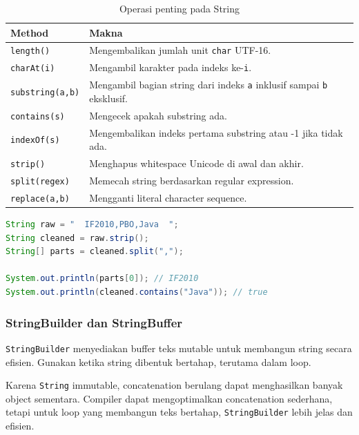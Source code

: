 \begin{table}[H]
\centering
\begin{tabularx}{\textwidth}{|L{0.24\textwidth}|X|}
\hline
\textbf{Method} & \textbf{Makna} \\
\hline
\texttt{length()} & Mengembalikan jumlah unit \texttt{char} UTF-16. \\
\hline
\texttt{charAt(i)} & Mengambil karakter pada indeks ke-\texttt{i}. \\
\hline
\texttt{substring(a,b)} & Mengambil bagian string dari indeks \texttt{a} inklusif sampai \texttt{b} eksklusif. \\
\hline
\texttt{contains(s)} & Mengecek apakah substring ada. \\
\hline
\texttt{indexOf(s)} & Mengembalikan indeks pertama substring atau -1 jika tidak ada. \\
\hline
\texttt{strip()} & Menghapus whitespace Unicode di awal dan akhir. \\
\hline
\texttt{split(regex)} & Memecah string berdasarkan regular expression. \\
\hline
\texttt{replace(a,b)} & Mengganti literal character sequence. \\
\hline
\end{tabularx}
\caption{Operasi penting pada String}
\label{tab:operasi-string}
\end{table}

\begin{lstlisting}[language=Java, caption={Contoh operasi dasar String}, label={lst:string-basic-ops}]
String raw = "  IF2010,PBO,Java  ";
String cleaned = raw.strip();
String[] parts = cleaned.split(",");

System.out.println(parts[0]); // IF2010
System.out.println(cleaned.contains("Java")); // true
\end{lstlisting}

\subsubsection{StringBuilder dan StringBuffer}

\begin{jawab}
\texttt{StringBuilder} menyediakan buffer teks mutable untuk membangun string secara efisien. Gunakan ketika string dibentuk bertahap, terutama dalam loop.
\end{jawab}

Karena \texttt{String} immutable, concatenation berulang dapat menghasilkan banyak object sementara. Compiler dapat mengoptimalkan concatenation sederhana, tetapi untuk loop yang membangun teks bertahap, \texttt{StringBuilder} lebih jelas dan efisien.

